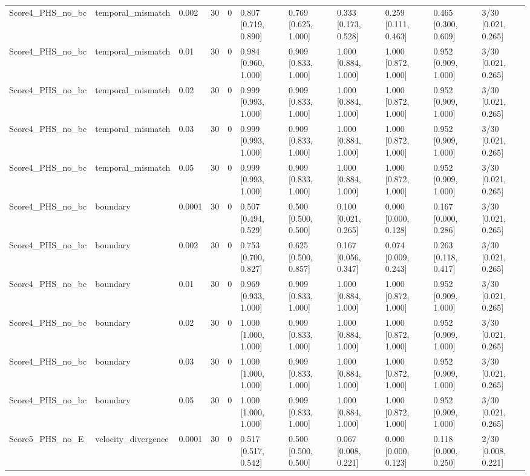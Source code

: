 \begin{longtable}{lllllllllll}
Score4\_PHS\_no\_bc & temporal\_mismatch & 0.002 & 30 & 0 & 0.807 [0.719, 0.890] & 0.769 [0.625, 1.000] & 0.333 [0.173, 0.528] & 0.259 [0.111, 0.463] & 0.465 [0.300, 0.609] & 3/30 [0.021, 0.265] \\
Score4\_PHS\_no\_bc & temporal\_mismatch & 0.01 & 30 & 0 & 0.984 [0.960, 1.000] & 0.909 [0.833, 1.000] & 1.000 [0.884, 1.000] & 1.000 [0.872, 1.000] & 0.952 [0.909, 1.000] & 3/30 [0.021, 0.265] \\
Score4\_PHS\_no\_bc & temporal\_mismatch & 0.02 & 30 & 0 & 0.999 [0.993, 1.000] & 0.909 [0.833, 1.000] & 1.000 [0.884, 1.000] & 1.000 [0.872, 1.000] & 0.952 [0.909, 1.000] & 3/30 [0.021, 0.265] \\
Score4\_PHS\_no\_bc & temporal\_mismatch & 0.03 & 30 & 0 & 0.999 [0.993, 1.000] & 0.909 [0.833, 1.000] & 1.000 [0.884, 1.000] & 1.000 [0.872, 1.000] & 0.952 [0.909, 1.000] & 3/30 [0.021, 0.265] \\
Score4\_PHS\_no\_bc & temporal\_mismatch & 0.05 & 30 & 0 & 0.999 [0.993, 1.000] & 0.909 [0.833, 1.000] & 1.000 [0.884, 1.000] & 1.000 [0.872, 1.000] & 0.952 [0.909, 1.000] & 3/30 [0.021, 0.265] \\
Score4\_PHS\_no\_bc & boundary & 0.0001 & 30 & 0 & 0.507 [0.494, 0.529] & 0.500 [0.500, 0.500] & 0.100 [0.021, 0.265] & 0.000 [0.000, 0.128] & 0.167 [0.000, 0.286] & 3/30 [0.021, 0.265] \\
Score4\_PHS\_no\_bc & boundary & 0.002 & 30 & 0 & 0.753 [0.700, 0.827] & 0.625 [0.500, 0.857] & 0.167 [0.056, 0.347] & 0.074 [0.009, 0.243] & 0.263 [0.118, 0.417] & 3/30 [0.021, 0.265] \\
Score4\_PHS\_no\_bc & boundary & 0.01 & 30 & 0 & 0.969 [0.933, 1.000] & 0.909 [0.833, 1.000] & 1.000 [0.884, 1.000] & 1.000 [0.872, 1.000] & 0.952 [0.909, 1.000] & 3/30 [0.021, 0.265] \\
Score4\_PHS\_no\_bc & boundary & 0.02 & 30 & 0 & 1.000 [1.000, 1.000] & 0.909 [0.833, 1.000] & 1.000 [0.884, 1.000] & 1.000 [0.872, 1.000] & 0.952 [0.909, 1.000] & 3/30 [0.021, 0.265] \\
Score4\_PHS\_no\_bc & boundary & 0.03 & 30 & 0 & 1.000 [1.000, 1.000] & 0.909 [0.833, 1.000] & 1.000 [0.884, 1.000] & 1.000 [0.872, 1.000] & 0.952 [0.909, 1.000] & 3/30 [0.021, 0.265] \\
Score4\_PHS\_no\_bc & boundary & 0.05 & 30 & 0 & 1.000 [1.000, 1.000] & 0.909 [0.833, 1.000] & 1.000 [0.884, 1.000] & 1.000 [0.872, 1.000] & 0.952 [0.909, 1.000] & 3/30 [0.021, 0.265] \\
Score5\_PHS\_no\_E & velocity\_divergence & 0.0001 & 30 & 0 & 0.517 [0.517, 0.542] & 0.500 [0.500, 0.500] & 0.067 [0.008, 0.221] & 0.000 [0.000, 0.123] & 0.118 [0.000, 0.250] & 2/30 [0.008, 0.221] \\

\end{longtable}
